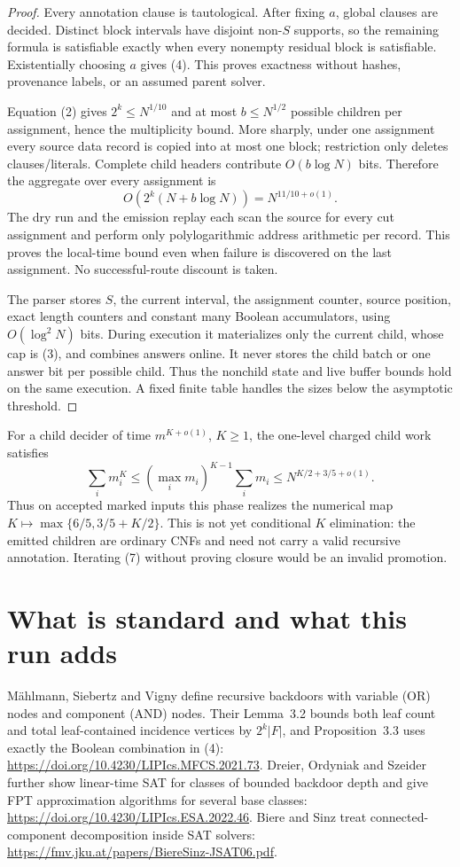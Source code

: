 \documentclass[11pt]{article}
\begin{document}
\begin{proof}
Every annotation clause is tautological.  After fixing $a$, global clauses
are decided.  Distinct block intervals have disjoint non-$S$ supports, so the
remaining formula is satisfiable exactly when every nonempty residual block
is satisfiable.  Existentially choosing $a$ gives (4).  This proves exactness
without hashes, provenance labels, or an assumed parent solver.

Equation (2) gives $2^k\le N^{1/10}$ and at most $b\le N^{1/2}$ possible
children per assignment, hence the multiplicity bound.  More sharply, under
one assignment every source data record is copied into at most one block;
restriction only deletes clauses/literals.  Complete child headers contribute
$O(b\log N)$ bits.  Therefore the aggregate over every assignment is
\[
 O\!\left(2^k(N+b\log N)\right)=N^{11/10+o(1)}.             \tag{6}
\]
The dry run and the emission replay each scan the source for every cut
assignment and perform only polylogarithmic address arithmetic per record.
This proves the local-time bound even when failure is discovered on the last
assignment.  No successful-route discount is taken.

The parser stores $S$, the current interval, the assignment counter, source
position, exact length counters and constant many Boolean accumulators, using
$O(\log^2N)$ bits.  During execution it materializes only the current child,
whose cap is (3), and combines answers online.  It never stores the child
batch or one answer bit per possible child.  Thus the nonchild state and live
buffer bounds hold on the same execution.  A fixed finite table handles the
sizes below the asymptotic threshold.
\end{proof}

For a child decider of time $m^{K+o(1)}$, $K\ge1$, the one-level charged
child work satisfies
\[
 \sum_i m_i^K
 \le (\max_i m_i)^{K-1}\sum_i m_i
 \le N^{K/2+3/5+o(1)}.                                    \tag{7}
\]
Thus on accepted marked inputs this phase realizes the numerical map
$K\mapsto\max\{6/5,3/5+K/2\}$.  This is not yet conditional $K$ elimination:
the emitted children are ordinary CNFs and need not carry a valid recursive
annotation.  Iterating (7) without proving closure would be an invalid
promotion.

\section{What is standard and what this run adds}
M\"ahlmann, Siebertz and Vigny define recursive backdoors with variable
(OR) nodes and component (AND) nodes.  Their Lemma~3.2 bounds both leaf count
and total leaf-contained incidence vertices by $2^k|F|$, and Proposition~3.3
uses exactly the Boolean combination in (4):
\url{https://doi.org/10.4230/LIPIcs.MFCS.2021.73}.
Dreier, Ordyniak and Szeider further show linear-time SAT for classes of
bounded backdoor depth and give FPT approximation algorithms for several
base classes:
\url{https://doi.org/10.4230/LIPIcs.ESA.2022.46}.
Biere and Sinz treat connected-component decomposition inside SAT solvers:
\url{https://fmv.jku.at/papers/BiereSinz-JSAT06.pdf}.
\end{document}
